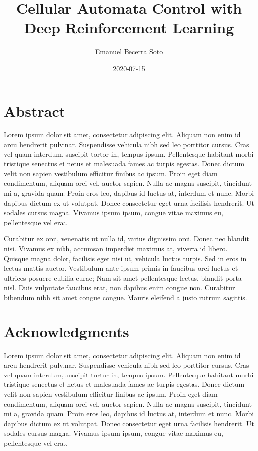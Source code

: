 \documentclass[
  openany]{book}
\title{Cellular Automata Control with Deep Reinforcement Learning}
\author{Emanuel Becerra Soto}
\date{2020-07-15}
\begin{document}
\maketitle

{
\setcounter{tocdepth}{1}
\tableofcontents
}
\listoftables
\listoffigures
\hypertarget{abstract}{%
\chapter*{Abstract}\label{abstract}}

Lorem ipsum dolor sit amet, consectetur adipiscing elit. Aliquam non enim id arcu hendrerit pulvinar. Suspendisse vehicula nibh sed leo porttitor cursus. Cras vel quam interdum, suscipit tortor in, tempus ipsum. Pellentesque habitant morbi tristique senectus et netus et malesuada fames ac turpis egestas. Donec dictum velit non sapien vestibulum efficitur finibus ac ipsum. Proin eget diam condimentum, aliquam orci vel, auctor sapien. Nulla ac magna suscipit, tincidunt mi a, gravida quam. Proin eros leo, dapibus id luctus at, interdum et nunc. Morbi dapibus dictum ex ut volutpat. Donec consectetur eget urna facilisis hendrerit. Ut sodales cursus magna. Vivamus ipsum ipsum, congue vitae maximus eu, pellentesque vel erat.

Curabitur ex orci, venenatis ut nulla id, varius dignissim orci. Donec nec blandit nisi. Vivamus ex nibh, accumsan imperdiet maximus at, viverra id libero. Quisque magna dolor, facilisis eget nisi ut, vehicula luctus turpis. Sed in eros in lectus mattis auctor. Vestibulum ante ipsum primis in faucibus orci luctus et ultrices posuere cubilia curae; Nam sit amet pellentesque lectus, blandit porta nisl. Duis vulputate faucibus erat, non dapibus enim congue non. Curabitur bibendum nibh sit amet congue congue. Mauris eleifend a justo rutrum sagittis.

\newpage

\hypertarget{acknowledgments}{%
\chapter*{Acknowledgments}\label{acknowledgments}}

Lorem ipsum dolor sit amet, consectetur adipiscing elit. Aliquam non enim id arcu hendrerit pulvinar. Suspendisse vehicula nibh sed leo porttitor cursus. Cras vel quam interdum, suscipit tortor in, tempus ipsum. Pellentesque habitant morbi tristique senectus et netus et malesuada fames ac turpis egestas. Donec dictum velit non sapien vestibulum efficitur finibus ac ipsum. Proin eget diam condimentum, aliquam orci vel, auctor sapien. Nulla ac magna suscipit, tincidunt mi a, gravida quam. Proin eros leo, dapibus id luctus at, interdum et nunc. Morbi dapibus dictum ex ut volutpat. Donec consectetur eget urna facilisis hendrerit. Ut sodales cursus magna. Vivamus ipsum ipsum, congue vitae maximus eu, pellentesque vel erat.
\end{document}
